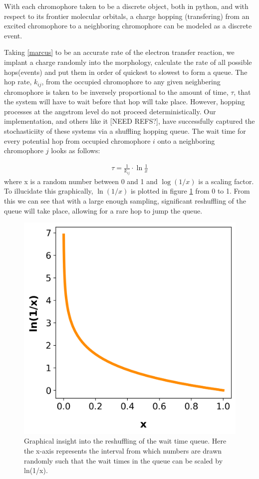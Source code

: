 With each chromophore taken to be a discrete object, both in python, and with respect to its frontier
molecular orbitals, a charge hopping (transfering) from an excited chromophore to a neighboring chromophore can be modeled
as a discrete event.

Taking \autoref{marcus} to be an
accurate rate of the electron transfer reaction, we implant a charge randomly into the morphology, calculate
the rate of all possible hops(events)
and put them in order of quickest to slowest to form a queue. The hop rate, $k_{ij}$, from the occupied chromophore to any
given neighbering chromophore is taken to be
inversely proportional to the amount of time, $\tau$, that the system will have to wait before that hop will
take place. However, hopping processes at the angstrom level do not proceed deterministically. 
Our implementation, and others like it [NEED REFS?], have
successfully captured the stochasticiity of these systems via a shuffling hopping queue.
The wait time for every potential hop from occupied chromophore $i$ onto a
neighboring chromophore $j$ looks as follows:

\begin{align}
    \tau = \frac{1}{k_{ij}} \cdot \ln{\frac{1}{x}} 
\end{align}
where x is a random number between 0 and 1 and $\log{(1/x)}$ is a scaling factor. To illucidate this
graphically, $\ln{(1/x)}$ is plotted in figure \ref{fig:ln} from 0 to 1. From this we can see that with
a large enough sampling, significant reshuffling of the queue will take place, allowing for a rare hop to jump
the queue.

\begin{figure}
  \center
  \includegraphics[width=0.8\linewidth]{figures/naturallog.png}
  \caption{Graphical insight into the reshuffling of the wait time queue. Here the x-axis represents the 
    interval from which numbers are drawn randomly such that the wait times in the queue can be scaled 
    by ln(1/x).}
  \label{fig:ln}
\end{figure}

